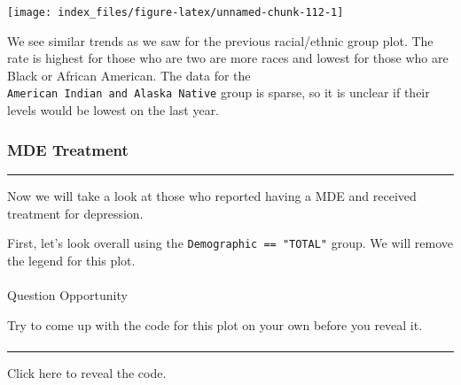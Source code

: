 \documentclass[
]{article}
\begin{document}
\begin{center}\texttt{[image: index\_files/figure-latex/unnamed-chunk-112-1]} \end{center}

We see similar trends as we saw for the previous racial/ethnic group
plot. The rate is highest for those who are two are more races and
lowest for those who are Black or African American. The data for the
\texttt{American\ Indian\ and\ Alaska\ Native} group is sparse, so it is
unclear if their levels would be lowest on the last year.

\hypertarget{mde-treatment}{%
\subsubsection{\texorpdfstring{\textbf{MDE
Treatment}}{MDE Treatment}}\label{mde-treatment}}

\begin{center}\rule{0.5\linewidth}{0.5pt}\end{center}

Now we will take a look at those who reported having a MDE and received
treatment for depression.

First, let's look overall using the \texttt{Demographic\ ==\ "TOTAL"}
group. We will remove the legend for this plot.

\hypertarget{section-30}{%
\paragraph{}\label{section-30}}

Question Opportunity

Try to come up with the code for this plot on your own before you reveal
it.

\hypertarget{section-31}{%
\paragraph{}\label{section-31}}

\begin{center}\rule{0.5\linewidth}{0.5pt}\end{center}

Click here to reveal the code.
\end{document}
